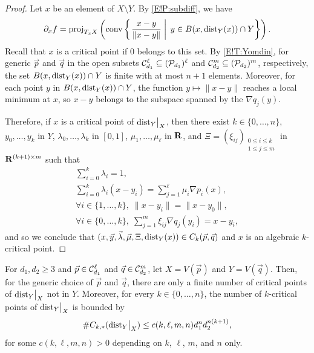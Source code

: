 \begin{proof}
  Let $x$ be an element of $X \setminus Y$. By \cref{E!P:subdiff}, we have
  \[
    \partial_x f = \operatorname{proj}_{T_x X} \left( \operatorname{conv} \left\{ \left. \frac{x - y}{\| x - y\|} \; \right| \; y \in B(x, \operatorname{dist}_Y(x)) \cap Y \right\} \right).
  \]
  Recall that $x$ is a critical point if $0$ belongs to this set. By \cref{E!T:Yomdin}, for generic $\vec{p}$ and $\vec{q}$ in the open subsets $\mathcal{C}_{d_1}^\ell \subseteq (\mathcal{P}_{d_1})^\ell$ and $\mathcal{C}_{d_2}^m \subseteq (\mathcal{P}_{d_2})^m$, respectively, the set $B(x, \operatorname{dist}_Y(x)) \cap Y$ is finite with at most $n + 1$ elements. Moreover, for each point $y$ in $B(x, \operatorname{dist}_Y(x)) \cap Y$, the function $y \mapsto \| x - y \|$ reaches a local minimum at $x$, so $x - y$ belongs to the subspace spanned by the $\nabla q_j(y)$.
  
  Therefore, if $x$ is a critical point of $\mathord{\operatorname{dist}}_Y\big|_X$, then there exist $k \in \{0, \ldots, n\}$, $y_0, \ldots, y_k$ in $Y$, $\lambda_0, \ldots, \lambda_k$ in $[0, 1]$, $\mu_1, \ldots, \mu_\ell$ in $\mathbf{R}$, and $\Xi = (\xi_{ij})_{\substack{0 \leq i \leq k \\ 1 \leq j \leq m}}$ in $\mathbf{R}^{(k + 1) \times m}$ such that
  \begin{equation}
  \label{E!eq:criticalabove}
  \begin{gathered}
    \sum_{i = 0}^k \lambda_i = 1, \\
    \sum_{i = 0}^k \lambda_i (x - y_i) = \sum_{j = 1}^\ell \mu_i \nabla p_i(x), \\
    \forall i \in \{1, \ldots, k\}, \; \| x - y_i \| = \| x - y_0 \|, \\
    \forall i \in \{0, \ldots, k\}, \; \sum_{j = 1}^m \xi_{ij} \nabla q_j(y_i) = x - y_i,
  \end{gathered}
  \end{equation}
  and so we conclude that $(x, \vec{y}, \vec{\lambda}, \vec{\mu}, \Xi, \operatorname{dist}_Y(x)) \in C_k(\vec{p}, \vec{q})$ and $x$ is an algebraic $k$-critical point.
\end{proof}

\begin{theorem}
\label{E!T:finite-crit-pt}
  For $d_1, d_2 \geq 3$ and $\vec{p} \in \mathcal{C}_{d_1}^\ell$ and $\vec{q} \in \mathcal{C}_{d_2}^m$, let $X = V(\vec{p})$ and $Y = V(\vec{q})$. Then, for the generic choice of $\vec{p}$ and $\vec{q}$, there are only a finite number of critical points of $\mathord{\operatorname{dist}}_Y\big|_X$ not in $Y$. Moreover, for every $k \in \{0, \ldots, n\}$, the number of $k$-critical points of $\mathord{\operatorname{dist}}_Y\big|_X$ is bounded by
  \[
    \#C_{k, *}(\mathord{\operatorname{dist}}_Y\big|_X) \leq c(k, \ell, m, n) d_1^n d_2^{n (k + 1)},
  \]
  for some $c(k, \ell, m, n) > 0$ depending on $k$, $\ell$, $m$, and $n$ only.
\end{theorem}

